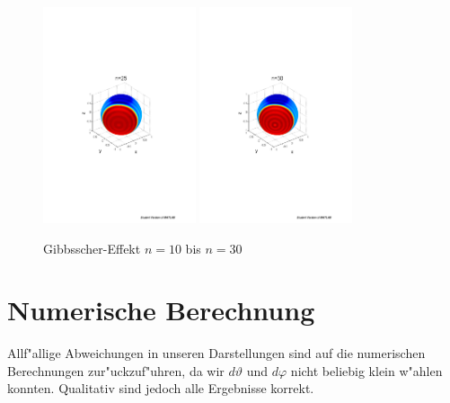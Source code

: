 \begin{refsection}
\begin{figure}
\includegraphics[width=0.4\textwidth]{kugel/Gibbs/GibbsN_25.pdf}
\includegraphics[width=0.4\textwidth]{kugel/Gibbs/GibbsN_30.pdf}
\caption{Gibbsscher-Effekt $n=10$ bis $n=30$
\label{skript:Gibbs2}}
\end{figure}

\section{Numerische Berechnung} 
Allf"allige Abweichungen in unseren Darstellungen sind auf die numerischen Berechnungen zur"uckzuf"uhren, da wir $d\vartheta$ und $d\varphi$ nicht beliebig klein w"ahlen konnten. Qualitativ sind jedoch alle Ergebnisse korrekt.

\printbibliography[heading=subbibliography]
\end{refsection}
